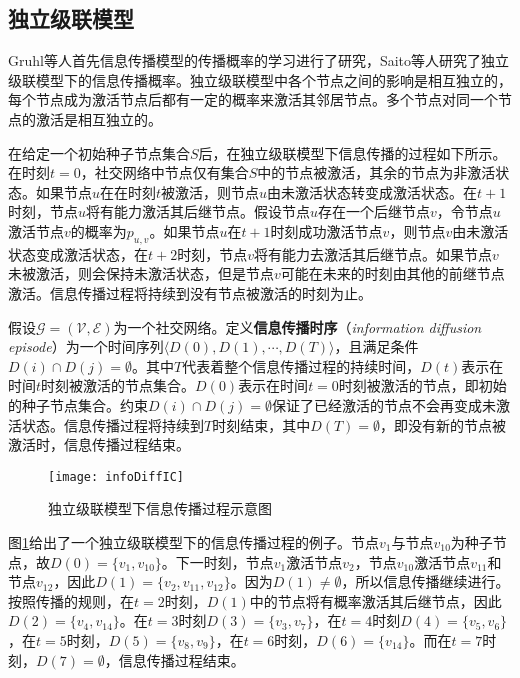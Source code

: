 \subsection{独立级联模型}
\label{subsec5:icModel}
Gruhl等人首先信息传播模型的传播概率的学习进行了研究，Saito等人研究了独立级联模型下的信息传播概率。独立级联模型中各个节点之间的影响是相互独立的，每个节点成为激活节点后都有一定的概率来激活其邻居节点。多个节点对同一个节点的激活是相互独立的。

在给定一个初始种子节点集合$S$后，在独立级联模型下信息传播的过程如下所示。在时刻$t=0$，社交网络中节点仅有集合$S$中的节点被激活，其余的节点为非激活状态。如果节点$u$在在时刻$t$被激活，则节点$u$由未激活状态转变成激活状态。在$t+1$时刻，节点$u$将有能力激活其后继节点。假设节点$u$存在一个后继节点$v$，令节点$u$激活节点$v$的概率为$p_{u,v}$。如果节点$u$在$t+1$时刻成功激活节点$v$，则节点$v$由未激活状态变成激活状态，在$t+2$时刻，节点$v$将有能力去激活其后继节点。如果节点$v$未被激活，则会保持未激活状态，但是节点$v$可能在未来的时刻由其他的前继节点激活。信息传播过程将持续到没有节点被激活的时刻为止。

假设$\mathcal{G}=\left(\mathcal{V},\mathcal{E}\right)$为一个社交网络。定义\textbf{信息传播时序}（\textit{information diffusion episode}）为一个时间序列$\langle D\left(0\right), D\left(1\right), \cdots, D\left(T\right) \rangle$，且满足条件$D\left(i\right) \cap D\left(j\right) = \emptyset$。其中$T$代表着整个信息传播过程的持续时间，$D\left(t\right)$表示在时间$t$时刻被激活的节点集合。$D\left(0\right)$表示在时间$t=0$时刻被激活的节点，即初始的种子节点集合。约束$D\left(i\right) \cap D\left(j\right) = \emptyset$保证了已经激活的节点不会再变成未激活状态。信息传播过程将持续到$T$时刻结束，其中$D\left(T\right) = \emptyset$，即没有新的节点被激活时，信息传播过程结束。

\begin{figure}[!ht]
    \centering
    \texttt{[image: infoDiffIC]}
    \caption{独立级联模型下信息传播过程示意图}
    \label{fig:infoDiffIC}
\end{figure}

图\ref{fig:infoDiffIC}给出了一个独立级联模型下的信息传播过程的例子。节点$v_1$与节点$v_{10}$为种子节点，故$D\left(0\right)=\{v_1,v_{10}\}$。下一时刻，节点$v_1$激活节点$v_2$，节点$v_{10}$激活节点$v_{11}$和节点$v_{12}$，因此$D\left(1\right)=\{v_2,v_{11},v_{12}\}$。因为$D\left(1\right) \neq \emptyset$，所以信息传播继续进行。按照传播的规则，在$t=2$时刻，$D\left(1\right)$中的节点将有概率激活其后继节点，因此$D\left(2\right)=\{v_4,v_{14}\}$。在$t=3$时刻$D\left(3\right)=\{v_3,v_7\}$，在$t=4$时刻$D\left(4\right)=\{v_5,v_6\}$，在$t=5$时刻，$D\left(5\right)=\{v_8,v_9\}$，在$t=6$时刻，$D\left(6\right)=\{v_{14}\}$。而在$t=7$时刻，$D\left(7\right)=\emptyset$，信息传播过程结束。

